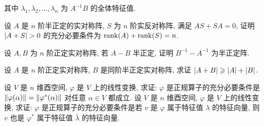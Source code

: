 \begin{exercise}[series=exer]
  其中 $ \lambda_{1}, \lambda_{2}, \dots, \lambda_{n} $ 为 $ A^{-1}B $ 的全体特征值.
  \item 设 $ A $ 是 $ n $ 阶半正定的实对称阵, $ S $ 为 $ n $ 阶实反对称阵, 满足 $ AS + SA = 0 $, 证明 $ \abs{A + S} > 0 $ 的充分必要条件为 $ \rank(A) + \rank(S) = n $.
  \item 设 $ A, B $ 为 $ n $ 阶正定实对称阵, 若 $ A - B $ 半正定, 证明 $ B^{-1} - A^{-1} $ 为半正定阵.
  \item 设 $ A $ 是 $ n $ 阶正定实对称阵, $ B $ 是同阶半正定实对称阵, 求证 $ \abs{A + B} \geqslant \abs{A} + \abs{B} $.
  \item 设 $ V $ 是 $ n $ 维酉空间, $ \varphi $ 是 $ V $ 上的线性变换, 求证: $ \varphi $ 是正规算子的充分必要条件是 $ \norm{\varphi(\alpha)} = \norm{\varphi^{*}(\alpha)} $ 对任意 $ \alpha \in V $ 都成立.
  \sitem 设 $ V $ 是 $ n $ 维酉空间, $ \varphi $ 是 $ V $ 上的线性变换, 求证: $ \varphi $ 是正规算子的充分必要条件是若 $ v $ 是 $ \varphi $ 属于特征值 $ \lambda $ 的特征向量, 则 $ v $ 也是 $ \varphi^{*} $ 属于特征值 $ \bar\lambda $ 的特征向量.
\end{exercise}
